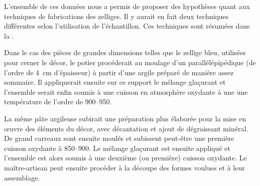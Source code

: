 L'ensemble de ces données nous a permis de proposer des hypothèses 
quant aux techniques de fabrications des zelliges. Il y aurait en fait 
deux techniques différentes selon l'utilisation de l'échantillon. Ces 
techniques sont résumées dans la .

Dans le cas des pièces de grandes dimensions telles que le zellige 
bleu, utilisées pour cerner le décor, le potier procéderait au moulage 
d'un  parallélépipédique (de l'ordre de \SI{4}{\cm} 
d'épaisseur) à partir d'une argile préparé de manière assez sommaire. 
Il appliquerait ensuite sur ce support le mélange glaçurant et 
l'ensemble serait enfin soumis à une cuisson en atmosphère oxydante 
à une une température de l'ordre de
\SIrange[range-phrase=\ à\ ]{900}{950}{\degC}.

La même pâte argileuse subirait une préparation plus élaborée pour la 
mise en {\oe}uvre des éléments du décor, avec décantation et ajout de 
dégraissant minéral. De grand carreaux sont ensuite moulés et 
subissent peut-être une première cuisson oxydante à 
\SIrange[range-phrase=\ à\ ]{850}{900}{\degC}. Le mélange glaçurant 
est ensuite appliqué et l'ensemble est alors soumis à une deuxième (ou 
première) cuisson oxydante. Le maître-artisan peut ensuite procéder à 
la découpe des formes voulues et à leur assemblage.


